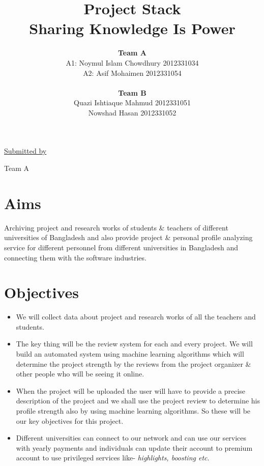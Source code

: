 \documentclass[dvips,12pt]{article}
\begin{document}
\title{\textbf{Project Stack}\\ \small{}Sharing Knowledge Is Power}
\author{\textbf{Team A}\\A1: Noymul Islam Chowdhury 2012331034\\A2: Asif Mohaimen 2012331054\\\\
\textbf{Team B}\\Quazi Ishtiaque Mahmud 2012331051\\Nowshad Hasan 2012331052}
\maketitle

\begin{center}
\underline{Submitted by}

Team A
\end{center}
\clearpage

\section{Aims}
Archiving project and research works of students \& teachers of different  universities  of Bangladesh and also provide project \& personal profile analyzing service for different personnel from different universities in Bangladesh and connecting them with the software industries.

\section{Objectives}
\begin{itemize}
\item We will collect data about project and research works of all the teachers and students.
\item The key thing will be the review system for each and every project. We will build an automated system using machine learning algorithms which will determine the project strength by the reviews from the project organizer \& other people who will be seeing it online.
\item When the project will be uploaded the user will have to provide a precise description of the project and we shall use the project review to determine his profile strength also by using machine learning algorithms. So these will be our key objectives for this project.
\item Different universities can connect to our network and can use our services with  yearly payments and individuals can update their account to premium account to use privileged services like- \emph{highlights, boosting etc}. 
\end{itemize}
\end{document}
